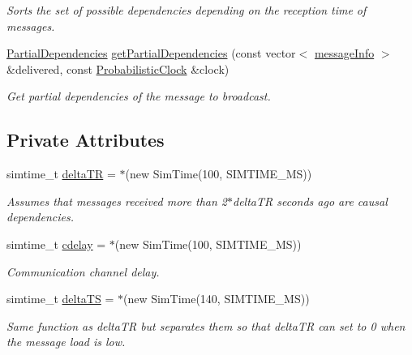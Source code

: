 \begin{DoxyCompactItemize}
\begin{DoxyCompactList}\small\item\em Sorts the set of possible dependencies depending on the reception time of messages. \end{DoxyCompactList}\item 
\hyperlink{class_partial_dependencies}{Partial\+Dependencies} \hyperlink{class_error_detector_interval_a9494a918f551eb1efcab39ffd68316d6}{get\+Partial\+Dependencies} (const vector$<$ \hyperlink{structures_8h_a7e7bdc1d2fff8a9436f2f352b2711ed6}{message\+Info} $>$ \&delivered, const \hyperlink{class_probabilistic_clock}{Probabilistic\+Clock} \&clock)
\begin{DoxyCompactList}\small\item\em Get partial dependencies of the message to broadcast. \end{DoxyCompactList}\end{DoxyCompactItemize}
\subsection*{Private Attributes}
\begin{DoxyCompactItemize}
\item 
simtime\+\_\+t \hyperlink{class_error_detector_interval_a24f229a469ae7c4314a948015cddb277}{delta\+TR} = $\ast$(new Sim\+Time(100, S\+I\+M\+T\+I\+M\+E\+\_\+\+MS))
\begin{DoxyCompactList}\small\item\em Assumes that messages received more than 2$\ast$delta\+TR seconds ago are causal dependencies. \end{DoxyCompactList}\item 
simtime\+\_\+t \hyperlink{class_error_detector_interval_adb614477095a1b9753f088f28776c677}{cdelay} = $\ast$(new Sim\+Time(100, S\+I\+M\+T\+I\+M\+E\+\_\+\+MS))
\begin{DoxyCompactList}\small\item\em Communication channel delay. \end{DoxyCompactList}\item 
simtime\+\_\+t \hyperlink{class_error_detector_interval_a2368ba76496cfd25487e150a961bb08b}{delta\+TS} = $\ast$(new Sim\+Time(140, S\+I\+M\+T\+I\+M\+E\+\_\+\+MS))
\begin{DoxyCompactList}\small\item\em Same function as delta\+TR but separates them so that delta\+TR can set to 0 when the message load is low. \end{DoxyCompactList}\end{DoxyCompactItemize}


